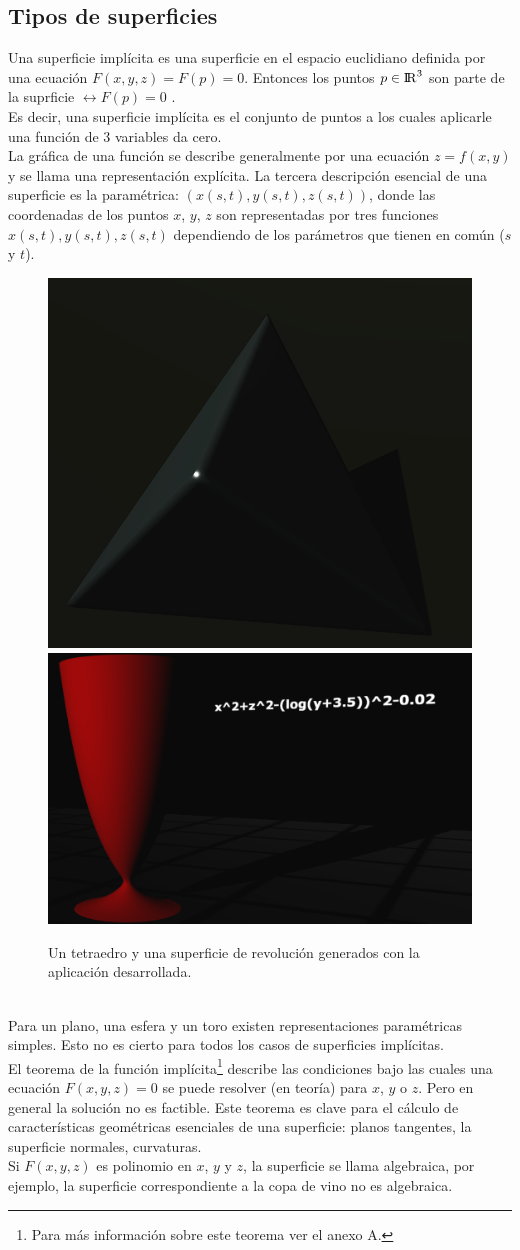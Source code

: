 \documentclass[12pt]{article}
\begin{document}
\subsection{Tipos de superficies}
Una superficie implícita es una superficie en el espacio euclidiano definida por una ecuación $F (x, y, z) =  F(p) = 0$. Entonces los  puntos $ p \in {\rm I\!R} ^3$ son parte de la suprficie $ \leftrightarrow F(p) = 0$ \cite{realtimerendering}.
\\Es decir, una superficie implícita es el conjunto de puntos a los cuales aplicarle una función de 3 variables da cero. 
\\La gráfica de una función se describe generalmente por una ecuación $z = f (x, y)$ y se llama una representación explícita\cite{implicitas}\cite{realtimerendering}. La tercera descripción esencial de una superficie es la paramétrica: $(x(s, t), y (s, t), z (s, t))$, donde las coordenadas de los puntos $x$, $y$, $z$ son representadas por tres funciones $x(s, t), y(s, t) , z(s, t)$ dependiendo de los parámetros que tienen en común ($s$ y $t$).
\begin{figure}[ht]
\includegraphics[width =0.45\linewidth]{tetraedro.png}
\hfill
\includegraphics[width =0.45\linewidth]{copa.png}
\caption{ Un tetraedro y una superficie de revolución generados con la aplicación desarrollada.}
\label{ fig : surface }
\end{figure}
\\Para un plano, una esfera y un toro existen representaciones paramétricas simples. Esto no es cierto para todos los casos de superficies implícitas.
\\El teorema de la función implícita\footnote{Para más información sobre este teorema ver el anexo A.} describe las condiciones bajo las cuales una ecuación $F (x, y, z) = 0$ se puede resolver (en teoría) para $x$, $y$ o $z$. Pero en general la solución no es factible. Este teorema es clave para el cálculo de características geométricas esenciales de una superficie: planos tangentes, la superficie normales, curvaturas.
\\Si $F (x, y, z)$ es polinomio en $x$, $y$ y $z$, la superficie se llama algebraica,  por ejemplo, la superficie correspondiente a la copa de vino no es algebraica.
\end{document}
